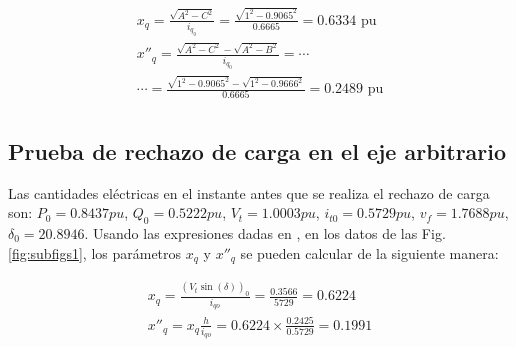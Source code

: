 \documentclass[conference]{IEEEtran}
\begin{document}
\begin{gather*}
x_q = \frac{\sqrt{A^2-C^2}}{i_{q_0}} = \frac{\sqrt{1^2 - 0.9065^2}}{0.6665} = 0.6334\text{ pu} \\
x''_q = \frac{\sqrt{A^2-C^2}-\sqrt{A^2-B^2}}{i_{q_0}}=\cdots\\
\cdots= \frac{\sqrt{1^2-0.9065^2}-\sqrt{1^2-0.9666^2}}{0.6665} = 0.2489\text{ pu}\\
\end{gather*}

\subsection{Prueba de rechazo de carga en el eje arbitrario}

Las cantidades eléctricas en el instante antes que se realiza el rechazo de carga son: $P_0 = 0.8437pu$, $Q_0 = 0.5222pu$, $V_t = 1.0003pu$, $i_{t0} = 0.5729pu$, $v_f = 1.7688pu$, $\delta_0 = 20.8946$.
Usando las expresiones dadas en \cite{Pequena2010}, en los datos de las Fig.\ref{fig:subfigs1}, los parámetros $x_q$ y $x''_q$ se pueden calcular de la siguiente manera:

\begin{gather}
    x_q = \frac{(V_t\sin(\delta))_0}{i_{qo}} = \frac{0.3566}{5729} = 0.6224\\
    x''_q = x_q\frac{h}{i_{qo}} = 0.6224\times\frac{0.2425}{0.5729} = 0.1991
\end{gather}
\end{document}
